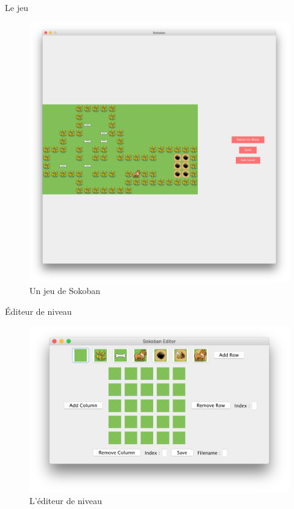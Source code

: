 \documentclass{beamer}
\begin{document}
\begin{frame}{Le jeu}
  \begin{figure}
    \includegraphics[width=.7\textwidth]{images/game.png}
    \vspace{-1em}
    \caption{Un jeu de Sokoban}
  \end{figure}
\end{frame}

\begin{frame}{Éditeur de niveau}
  \begin{figure}
    \includegraphics[width=\textwidth]{images/editor.png}
    \vspace{-2em}
    \caption{L'éditeur de niveau}
  \end{figure}
\end{frame}

\end{document}

